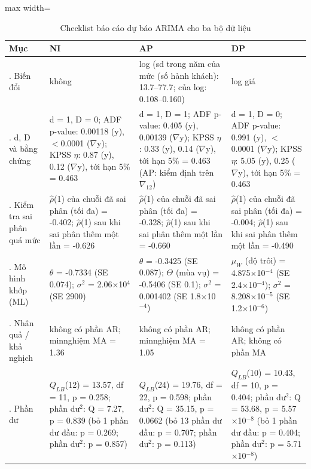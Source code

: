 \begin{table}[H]
\centering\footnotesize
\caption{Checklist báo cáo dự báo ARIMA cho ba bộ dữ liệu}\label{tab:tab_b12_14_checklist}
\begin{adjustbox}{max width=\linewidth}
\begin{tabular}{|>{\raggedright\arraybackslash}p{}|>{\raggedright\arraybackslash}p{}|>{\raggedright\arraybackslash}p{}|>{\raggedright\arraybackslash}p{}|}
\toprule
Mục & NI & AP & DP \\
\midrule
1. Biến đổi & không & log (sd trong năm của mức (số hành khách): 13.7–77.7; của log: 0.108–0.160) & log giá \\[3pt]
2. d, D và bằng chứng & d = 1, D = 0; ADF p-value: 0.00118 (y), $<$0.0001 ($\nabla$y); KPSS $\eta$: 0.87 (y), 0.12 ($\nabla$y), tới hạn 5\% = 0.463 & d = 1, D = 1; ADF p-value: 0.405 (y), 0.00139 ($\nabla$y); KPSS $\eta$: 0.33 (y), 0.14 ($\nabla$y), tới hạn 5\% = 0.463 (AP: kiểm định trên $\nabla_{12}$) & d = 1, D = 0; ADF p-value: 0.991 (y), $<$0.0001 ($\nabla$y); KPSS $\eta$: 5.05 (y), 0.25 ($\nabla$y), tới hạn 5\% = 0.463 \\[3pt]
3. Kiểm tra sai phân quá mức & $\hat{\rho}$(1) của chuỗi đã sai phân (tối đa) = -0.402; $\hat{\rho}$(1) sau khi sai phân thêm một lần = -0.626 & $\hat{\rho}$(1) của chuỗi đã sai phân (tối đa) = -0.328; $\hat{\rho}$(1) sau khi sai phân thêm một lần = -0.660 & $\hat{\rho}$(1) của chuỗi đã sai phân (tối đa) = -0.004; $\hat{\rho}$(1) sau khi sai phân thêm một lần = -0.490 \\[3pt]
4. Mô hình khớp (ML) & $\theta$ = -0.7334 (SE 0.074); $\sigma^{2}$ = 2.06$\times$10$^{4}$ (SE 2900) & $\theta$ = -0.3425 (SE 0.087); $\Theta$ (mùa vụ) = -0.5406 (SE 0.1); $\sigma^{2}$ = 0.001402 (SE 1.8$\times$10$^{-4}$) & $\mu_{W}$ (độ trôi) = 4.875$\times$10$^{-4}$ (SE 2.4$\times$10$^{-4}$); $\sigma^{2}$ = 8.208$\times$10$^{-5}$ (SE 1.2$\times$10$^{-6}$) \\[3pt]
5. Nhân quả / khả nghịch & không có phần AR; min\textbar{}nghiệm MA\textbar{} = 1.36 & không có phần AR; min\textbar{}nghiệm MA\textbar{} = 1.05 & không có phần AR; không có phần MA \\[3pt]
6. Phần dư & $Q_{LB}$(12) = 13.57, df = 11, p = 0.258; phần dư$^{2}$: Q = 7.27, p = 0.839 (bỏ 1 phần dư đầu: p = 0.269; phần dư$^{2}$: p = 0.857) & $Q_{LB}$(24) = 19.76, df = 22, p = 0.598; phần dư$^{2}$: Q = 35.15, p = 0.0662 (bỏ 13 phần dư đầu: p = 0.707; phần dư$^{2}$: p = 0.113) & $Q_{LB}$(10) = 10.43, df = 10, p = 0.404; phần dư$^{2}$: Q = 53.68, p = 5.57$\times$10$^{-8}$ (bỏ 1 phần dư đầu: p = 0.404; phần dư$^{2}$: p = 5.71$\times$10$^{-8}$) \\[3pt]

\end{tabular}
\end{adjustbox}
\end{table}

